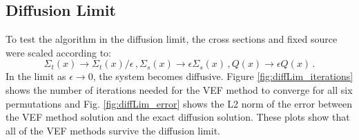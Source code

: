 \subsection{Diffusion Limit}
To test the algorithm in the diffusion limit, the cross sections and fixed source were scaled according to: 
	\begin{subequations} \label{res:scaling}
	\begin{equation} 
		\Sigma_t(x) \rightarrow \Sigma_t(x)/\epsilon\,, 
	\end{equation}
	\begin{equation}
		\Sigma_s(x) \rightarrow \epsilon \Sigma_s(x) \,,
	\end{equation}
	\begin{equation}
		Q(x) \rightarrow \epsilon Q(x)\,. 
	\end{equation}
	\end{subequations}
In the limit as $\epsilon \rightarrow 0$, the system becomes diffusive. Figure \ref{fig:diffLim_iterations} shows the number of iterations needed for the VEF method to converge for all six permutations and Fig. \ref{fig:diffLim_error} shows the L2 norm of the error between the VEF method solution and the exact diffusion solution. These plots show that all of the VEF methods survive the diffusion limit. 

